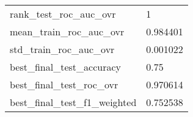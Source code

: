 \begin{tabular}{ll}
rank\_test\_roc\_auc\_ovr       &                                                  1 \\
mean\_train\_roc\_auc\_ovr      &                                           0.984401 \\
std\_train\_roc\_auc\_ovr       &                                           0.001022 \\
best\_final\_test\_accuracy    &                                               0.75 \\
best\_final\_test\_roc\_ovr     &                                           0.970614 \\
best\_final\_test\_f1\_weighted &                                           0.752538 \\
\bottomrule
\end{tabular}
